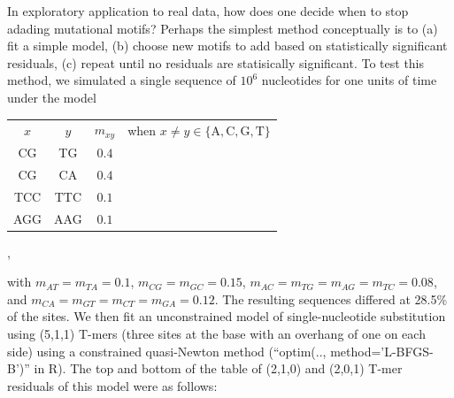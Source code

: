 \documentclass{article}
\newcommand{\nA}{\mbox{A}}  %
\newcommand{\nC}{\mbox{C}}
\newcommand{\nG}{\mbox{G}}
\newcommand{\nT}{\mbox{T}}
\theoremstyle{plain}
\theoremstyle{definition}
\begin{document}
In exploratory application to real data, how does one decide when to stop adading mutational motifs?
Perhaps the simplest method conceptually is to 
(a) fit a simple model,
(b) choose new motifs to add based on statistically significant residuals,
(c) repeat until no residuals are statisically significant.
To test this method,
we simulated a single sequence of $10^6$ nucleotides
for one units of time
under the model
    \begin{center}
      \begin{tabular}{c@{\quad$\to$\quad}c@{\quad at rate\quad }cc}
        $x$  &    $y$  &  $m_{xy}$ & when $x \neq y \in \{\nA,\nC,\nG,\nT\}$  \\
        \nC\nG     &  \nT\nG     &  $0.4$ & \\
        \nC\nG     &  \nC\nA     &  $0.4$ & \\
        \nT\nC\nC  &  \nT\nT\nC  &  $0.1$ & \\
        \nA\nG\nG  &  \nA\nA\nG  &  $0.1$ &
      \end{tabular} ,
    \end{center}
with $m_{AT}=m_{TA}=0.1$, $m_{CG}=m_{GC}=0.15$, $m_{AC}=m_{TG}=m_{AG}=m_{TC}=0.08$, and $m_{CA}=m_{GT}=m_{CT}=m_{GA}=0.12$.
The resulting sequences differed at 28.5\% of the sites.
We then fit an unconstrained model of single-nucleotide substitution using (5,1,1) T-mers
(three sites at the base with an overhang of one on each side)
using a constrained quasi-Newton method (``optim(.., method='L-BFGS-B')'' in R).
The top and bottom of the table of (2,1,0) and (2,0,1) T-mer residuals of this model were as follows:
\end{document}
